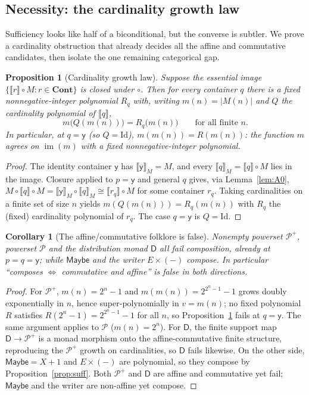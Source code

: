 \documentclass[11pt]{amsart}
\theoremstyle{plain}
\newtheorem{proposition}[theorem]{Proposition}
\newtheorem{corollary}[theorem]{Corollary}
\theoremstyle{definition}
\newcommand{\Cont}{\mathbf{Cont}}
\newcommand{\ext}[1]{\llbracket #1 \rrbracket}
\newcommand{\extM}[1]{\llbracket #1 \rrbracket_{M}}
\newcommand{\Id}{\mathrm{Id}}
\newcommand{\y}{\mathsf{y}}
\newcommand{\D}{\mathsf{D}}
\newcommand{\Maybe}{\mathsf{Maybe}}
\DeclareMathOperator{\im}{im}
\begin{document}
\subsection{Necessity: the cardinality growth law}\label{sec:card}
Sufficiency looks like half of a biconditional, but the converse is subtler. We prove a
cardinality obstruction that already decides all the affine and commutative candidates, then isolate
the one remaining categorical gap.

\begin{proposition}[Cardinality growth law]\label{prop:cardlaw}
Suppose the essential image $\{\ext{r}\circ M:r\in\Cont\}$ is closed under $\circ$. Then for every
container $q$ there is a fixed nonnegative-integer polynomial $R_q$ with, writing $m(n)=|M(n)|$ and
$Q$ the cardinality polynomial of $\ext{q}$,
\[
  m\bigl(Q(m(n))\bigr)=R_q\bigl(m(n)\bigr)\qquad\text{for all finite }n.
\]
In particular, at $q=\y$ \textup(so $Q=\Id$\textup), $m(m(n))=R(m(n))$: the function $m$ agrees on
$\im(m)$ with a fixed nonnegative-integer polynomial.
\end{proposition}

\begin{proof}
The identity container $\y$ has $\extM{\y}=M$, and every $\extM{q}=\ext{q}\circ M$ lies in the image.
Closure applied to $p=\y$ and general $q$ gives, via Lemma~\ref{lem:A0},
$M\circ\ext{q}\circ M=\extM{\y}\circ\extM{q}\cong\ext{r_q}\circ M$ for some container $r_q$. Taking
cardinalities on a finite set of size $n$ yields $m(Q(m(n)))=R_q(m(n))$ with $R_q$ the (fixed)
cardinality polynomial of $r_q$. The case $q=\y$ is $Q=\Id$.
\end{proof}

\begin{corollary}[The affine/commutative folklore is false]\label{cor:folklore}
Nonempty powerset $\mathcal P^{+}$, powerset $\mathcal P$ and the distribution monad $\D$ all fail
composition, already at $p=q=\y$; while $\Maybe$ and the writer $E\times(-)$ compose. In particular
``composes $\iff$ commutative and affine'' is false in both directions.
\end{corollary}

\begin{proof}
For $\mathcal P^{+}$, $m(n)=2^{n}-1$ and $m(m(n))=2^{2^{n}-1}-1$ grows doubly exponentially in $n$,
hence super-polynomially in $v=m(n)$; no fixed polynomial $R$ satisfies $R(2^n-1)=2^{2^n-1}-1$ for
all $n$, so Proposition~\ref{prop:cardlaw} fails at $q=\y$. The same argument applies to $\mathcal P$
($m(n)=2^n$). For $\D$, the finite support map $\D\to\mathcal P^{+}$ is a monad morphism onto the
affine-commutative finite structure, reproducing the $\mathcal P^{+}$ growth on cardinalities, so $\D$
fails likewise. On the other side, $\Maybe=X+1$ and $E\times(-)$ are polynomial, so they compose by
Proposition~\ref{prop:suff}. Both $\mathcal P^{+}$ and $\D$ are affine and commutative yet fail;
$\Maybe$ and the writer are non-affine yet compose.
\end{proof}
\end{document}
